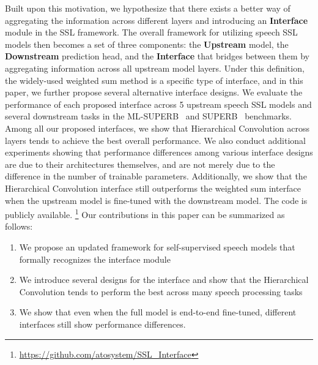Built upon this motivation, we hypothesize that there exists a better way of aggregating the information across different layers and introducing an \textbf{Interface} module in the SSL framework.
The overall framework for utilizing speech SSL models then becomes a set of three components: the
\textbf{Upstream} model, the \textbf{Downstream} prediction head, and the \textbf{Interface} that bridges between them by aggregating information across all upstream model layers.
Under this definition, the widely-used weighted sum method is a specific type of interface, and in this paper, we further propose several alternative interface designs.
We evaluate the performance of each proposed interface across 5 upstream speech SSL models and several downstream tasks in the ML-SUPERB~\cite{shi23g_mlsuperb} and SUPERB~\cite{yang21c_superb} benchmarks.
Among all our proposed interfaces, we show that Hierarchical Convolution across layers tends to achieve the best overall performance.
We also conduct additional experiments showing that performance differences among various interface designs are due to their architectures themselves, and are not merely due to the difference in the number of trainable parameters.
Additionally, we show that the Hierarchical Convolution interface still outperforms the weighted sum interface when the upstream model is fine-tuned with the downstream model.
The code is publicly available.
\footnote{\url{https://github.com/atosystem/SSL_Interface}}
Our contributions in this paper can be summarized as follows:
\begin{enumerate}
    \item We propose an updated framework for self-supervised speech models that formally recognizes the interface module
    \item We introduce several designs for the interface and show that the Hierarchical Convolution tends to perform the best across many speech processing tasks
    \item We show that even when the full model is end-to-end fine-tuned, different interfaces still show performance differences.
\end{enumerate}